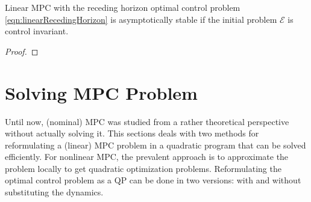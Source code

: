 				\begin{theorem}
					Linear MPC with the receding horizon optimal control problem \eqref{eqn:linearRecedingHorizon} is asymptotically stable if the initial problem \(\mathcal{E}\) is control invariant.
				\end{theorem}
				\begin{proof}
				\end{proof}

	\section{Solving MPC Problem}
		Until now, (nominal) MPC was studied from a rather theoretical perspective without actually solving it. This sections deals with two methods for reformulating a (linear) MPC problem in a quadratic program that can be solved efficiently. For nonlinear MPC, the prevalent approach is to approximate the problem locally to get quadratic optimization problems. Reformulating the optimal control problem as a QP can be done in two versions: with and without substituting the dynamics.

